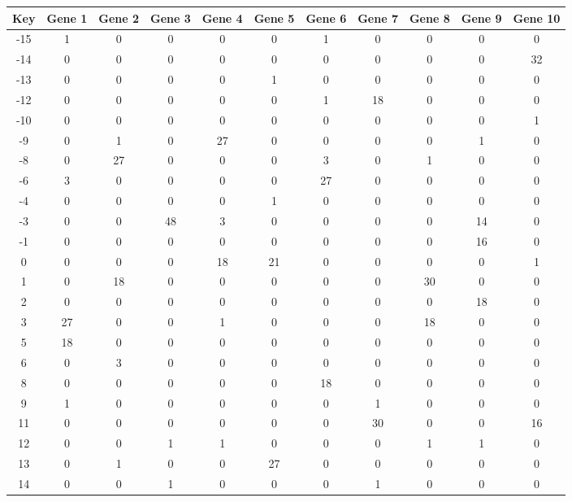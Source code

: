 \begin{tabular}{|c|c|c|c|c|c|c|c|c|c|c|}
\hline
Key & Gene 1 & Gene 2 & Gene 3 & Gene 4 & Gene 5 & Gene 6 & Gene 7 & Gene 8 & Gene 9 & Gene 10 \\
\hline
-15 & 1 & 0 & 0 & 0 & 0 & 1 & 0 & 0 & 0 & 0 \\
-14 & 0 & 0 & 0 & 0 & 0 & 0 & 0 & 0 & 0 & 32 \\
-13 & 0 & 0 & 0 & 0 & 1 & 0 & 0 & 0 & 0 & 0 \\
-12 & 0 & 0 & 0 & 0 & 0 & 1 & 18 & 0 & 0 & 0 \\
-10 & 0 & 0 & 0 & 0 & 0 & 0 & 0 & 0 & 0 & 1 \\
-9 & 0 & 1 & 0 & 27 & 0 & 0 & 0 & 0 & 1 & 0 \\
-8 & 0 & 27 & 0 & 0 & 0 & 3 & 0 & 1 & 0 & 0 \\
-6 & 3 & 0 & 0 & 0 & 0 & 27 & 0 & 0 & 0 & 0 \\
-4 & 0 & 0 & 0 & 0 & 1 & 0 & 0 & 0 & 0 & 0 \\
-3 & 0 & 0 & 48 & 3 & 0 & 0 & 0 & 0 & 14 & 0 \\
-1 & 0 & 0 & 0 & 0 & 0 & 0 & 0 & 0 & 16 & 0 \\
0 & 0 & 0 & 0 & 18 & 21 & 0 & 0 & 0 & 0 & 1 \\
1 & 0 & 18 & 0 & 0 & 0 & 0 & 0 & 30 & 0 & 0 \\
2 & 0 & 0 & 0 & 0 & 0 & 0 & 0 & 0 & 18 & 0 \\
3 & 27 & 0 & 0 & 1 & 0 & 0 & 0 & 18 & 0 & 0 \\
5 & 18 & 0 & 0 & 0 & 0 & 0 & 0 & 0 & 0 & 0 \\
6 & 0 & 3 & 0 & 0 & 0 & 0 & 0 & 0 & 0 & 0 \\
8 & 0 & 0 & 0 & 0 & 0 & 18 & 0 & 0 & 0 & 0 \\
9 & 1 & 0 & 0 & 0 & 0 & 0 & 1 & 0 & 0 & 0 \\
11 & 0 & 0 & 0 & 0 & 0 & 0 & 30 & 0 & 0 & 16 \\
12 & 0 & 0 & 1 & 1 & 0 & 0 & 0 & 1 & 1 & 0 \\
13 & 0 & 1 & 0 & 0 & 27 & 0 & 0 & 0 & 0 & 0 \\
14 & 0 & 0 & 1 & 0 & 0 & 0 & 1 & 0 & 0 & 0 \\
\hline
\end{tabular}